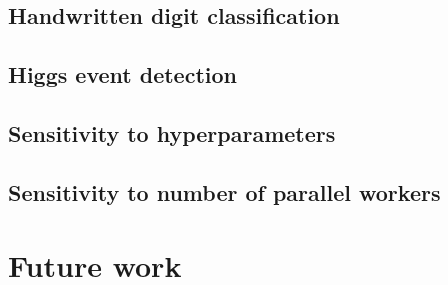 \subsection{Handwritten digit classification}
\label{sec:adag_experiment_mnist}

\subsection{Higgs event detection}
\label{sec:adag_experiment_higgs}

\subsection{Sensitivity to hyperparameters}
\label{sec:adag_experiment_hyperparameter_sensitivity}

\subsection{Sensitivity to number of parallel workers}
\label{sec:adag_experiment_parallel_workers}

\section{Future work}
\label{sec:adag_future_work}
